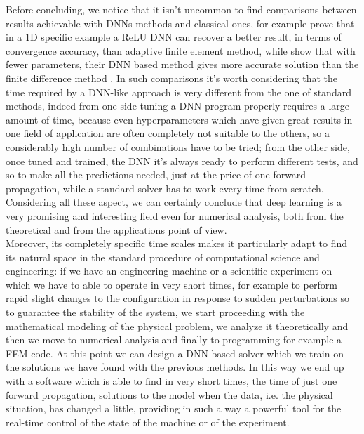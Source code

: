 \documentclass[12pt, a4paper]{report}
\theoremstyle{definition}
\begin{document}
Before concluding, we notice that it isn't uncommon to find comparisons between results achievable with DNNs methods and classical ones, for example \cite{Jinchao} prove that in a 1D specific example a ReLU DNN can recover a better result, in terms of convergence accuracy, than adaptive finite element method, while \cite{Weinan} show that with fewer parameters, their DNN based method gives more accurate solution than the finite difference method . In such comparisons it's worth considering that the time required by a DNN-like approach is very different from the one of standard methods, indeed from one side tuning a DNN program properly requires a large amount of time, because even hyperparameters which have given great results in one field of application are often completely not suitable to the others, so a considerably high number of combinations have to be tried; from the other side, once tuned and trained, the DNN it's always ready to perform different tests, and so to make all the predictions needed, just at the price of one forward propagation, while a standard solver has to work every time from scratch.\\ 
Considering all these aspect, we can certainly conclude that deep learning is a very promising and interesting field even for numerical analysis, both from the theoretical and from the applications point of view.\\
Moreover, its completely specific time scales makes it particularly adapt to find its natural space in the standard procedure of computational science and engineering: if we have an engineering machine or a scientific experiment on which we have to able to operate in very short times, for example to perform rapid slight changes to the configuration in response to sudden perturbations so to guarantee the stability of the system, we start proceeding with the mathematical modeling of the physical problem, we analyze it theoretically and then we move to numerical analysis and finally to programming for example a FEM code. At this point we can design a DNN based solver which we train on the solutions we have found with the previous methods. In this way we end up with a software which is able to find in very short times, the time of just one forward propagation, solutions to the model when the data, i.e. the physical situation, has changed a little, providing in such a way a powerful tool for the real-time control of the state of the machine or of the experiment.


\end{document}
